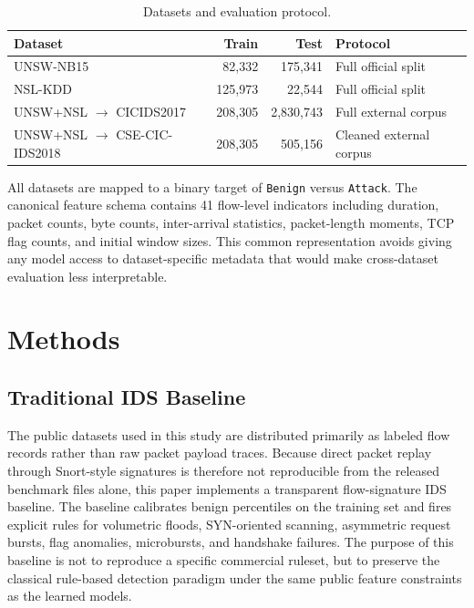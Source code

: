 \documentclass[conference]{IEEEtran}
\begin{document}
\begin{table}[t]
\caption{Datasets and evaluation protocol.}
\label{tab:datasets}
\centering
\scriptsize
\begin{tabular}{@{}p{1.75cm}rrp{1.7cm}@{}}
\toprule
Dataset & Train & Test & Protocol \\
\midrule
UNSW-NB15 & 82{,}332 & 175{,}341 & Full official split \\
NSL-KDD & 125{,}973 & 22{,}544 & Full official split \\
\shortstack[l]{UNSW+NSL\\$\rightarrow$ CICIDS2017} & 208{,}305 & 2{,}830{,}743 & Full external corpus \\
\shortstack[l]{UNSW+NSL\\$\rightarrow$ CSE-CIC-IDS2018} & 208{,}305 & 505{,}156 & Cleaned external corpus \\
\bottomrule
\end{tabular}
\end{table}

All datasets are mapped to a binary target of \texttt{Benign} versus \texttt{Attack}. The canonical feature schema contains 41 flow-level indicators including duration, packet counts, byte counts, inter-arrival statistics, packet-length moments, TCP flag counts, and initial window sizes. This common representation avoids giving any model access to dataset-specific metadata that would make cross-dataset evaluation less interpretable.

\section{Methods}
\subsection{Traditional IDS Baseline}
The public datasets used in this study are distributed primarily as labeled flow records rather than raw packet payload traces. Because direct packet replay through Snort-style signatures is therefore not reproducible from the released benchmark files alone, this paper implements a transparent flow-signature IDS baseline. The baseline calibrates benign percentiles on the training set and fires explicit rules for volumetric floods, SYN-oriented scanning, asymmetric request bursts, flag anomalies, microbursts, and handshake failures. The purpose of this baseline is not to reproduce a specific commercial ruleset, but to preserve the classical rule-based detection paradigm under the same public feature constraints as the learned models.
\end{document}
